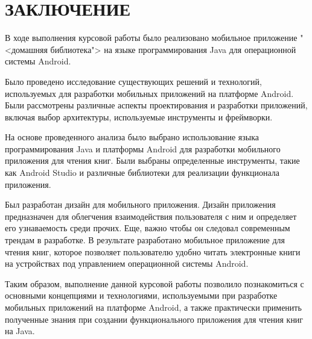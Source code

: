 \chapter*{ЗАКЛЮЧЕНИЕ}
В ходе выполнения курсовой работы было реализовано
мобильное приложение "<домашняя библиотека"> на языке программирования Java
для операционной системы Android.\par
Было проведено исследование существующих решений и технологий, используемых
для разработки мобильных приложений на платформе Android.
Были рассмотрены различные аспекты проектирования и разработки приложений,
включая выбор архитектуры, используемые инструменты и фреймворки.\par
На основе проведенного анализа было выбрано использование
языка программирования Java и платформы Android для разработки
мобильного приложения для чтения книг. Были выбраны определенные инструменты,
такие как Android Studio и различные библиотеки
для реализации функционала приложения.\par
Был разработан дизайн для мобильного приложения. Дизайн
приложения предназначен для облегчения взаимодействия пользователя с ним
и определяет его узнаваемость среди прочих. Еще, важно чтобы он следовал
современным трендам в разработке.
В результате разработано мобильное приложение для чтения книг,
которое позволяет пользователю удобно читать электронные книги
на устройствах под управлением операционной системы Android.\par
Таким образом, выполнение данной курсовой работы позволило познакомиться
с основными концепциями и технологиями,
используемыми при разработке мобильных приложений на платформе Android,
а также практически применить полученные знания
при создании функционального приложения для чтения книг на Java.
\label{lastpage}


